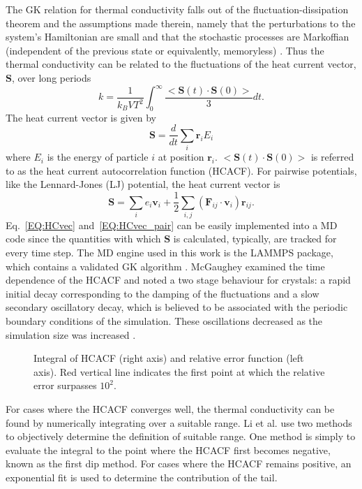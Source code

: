 The GK relation for thermal conductivity falls out of the fluctuation-dissipation theorem and the assumptions made therein, namely that the perturbations to the system's Hamiltonian are small and that the stochastic processes are Markoffian (independent of the previous state or equivalently, memoryless) \cite{green:398}. Thus the thermal conductivity can be related to the fluctuations of the heat current vector, $\bm{S}$, over long periods
%
\begin{equation}\label{EQ:intHCACF}
k=\frac{1}{k_B V T^2}\int_0^{\infty}\frac{<\bm{S}(t)\cdot\bm{S}(0)>}{3}dt.
\end{equation}
%
The heat current vector is given by 
%
\begin{equation}\label{EQ:HCvec}
\bm{S}=\frac{d}{dt}\sum_i\bm{r}_iE_i
\end{equation}
%
where $E_i$ is the energy of particle $i$ at position $\bm{r}_i$. $<\bm{S}(t)\cdot\bm{S}(0)>$ is referred to as the heat current autocorrelation function (HCACF). For pairwise potentials, like the Lennard-Jones (LJ) potential, the heat current vector is
%
\begin{equation}\label{EQ:HCvec_pair}
\bm{S}=\sum_ie_i\bm{v}_i+\frac{1}{2}\sum_{i,j}(\bm{F}_{ij}\cdot\bm{v}_{i})\bm{r}_{ij}.
\end{equation}
%
Eq.~\ref{EQ:HCvec} and~\ref{EQ:HCvec_pair} can be easily implemented into a MD code since the quantities with which $\bm{S}$ is calculated, typically, are tracked for every time step. The MD engine used in this work is  the LAMMPS package, which contains a validated GK algorithm \cite{LAMMPS}. McGaughey examined the time dependence of the HCACF and noted a two stage behaviour for crystals: a rapid initial decay corresponding to the damping of the fluctuations and a slow secondary oscillatory decay, which is believed to be associated with the periodic boundary conditions of the simulation. These oscillations decreased as the simulation size was increased \cite{mcgaugheythesis}.
%
\begin{figure}
\begin{center}
\renewcommand{\figure}{Fig.}
\caption{Integral of HCACF (right axis) and relative error function (left axis). Red vertical line indicates the first point at which the relative error surpasses $10^2$.}
\label{FIG:GK_bulk}
\end{center}
\end{figure}
%
For cases where the HCACF converges well, the thermal conductivity can be found by numerically integrating over a suitable range. Li et al. \cite{Li1998139} use two methods to objectively determine the definition of suitable range. One method is simply to evaluate the integral to the point where the HCACF first becomes negative, known as the first dip method. For cases where the HCACF remains positive, an exponential fit is used to determine the contribution of the tail.

